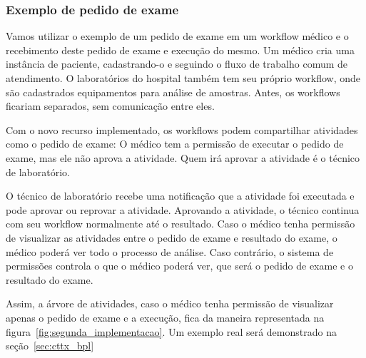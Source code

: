 \subsubsection{Exemplo de pedido de exame}

Vamos utilizar o exemplo de um pedido de exame em um workflow médico e o recebimento deste pedido de exame e execução do mesmo.
Um médico cria uma instância de paciente, cadastrando-o e seguindo o fluxo de trabalho comum de atendimento.
O laboratórios do hospital também tem seu próprio workflow, onde são cadastrados equipamentos para análise de amostras.
Antes, os workflows ficariam separados, sem comunicação entre eles.

Com o novo recurso implementado, os workflows podem compartilhar atividades como o pedido de exame: O médico tem a permissão de executar o pedido de exame, mas ele não aprova a atividade. Quem irá aprovar a atividade é o técnico de laboratório.

O técnico de laboratório recebe uma notificação que a atividade foi executada e pode aprovar ou reprovar a atividade.
Aprovando a atividade, o técnico continua com seu workflow normalmente até o resultado.
Caso o médico tenha permissão de visualizar as atividades entre o pedido de exame e resultado do exame, o médico poderá ver todo o processo de análise.
Caso contrário, o sistema de permissões controla o que o médico poderá ver, que será o pedido de exame e o resultado do exame.

Assim, a árvore de atividades, caso o médico tenha permissão de visualizar apenas o pedido de exame e a execução, fica da maneira representada na figura~\ref{fig:segunda_implementacao}. Um exemplo real será demonstrado na seção~\ref{sec:cttx_bpl}

